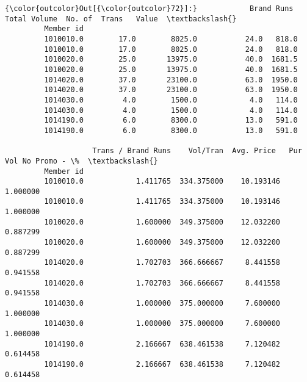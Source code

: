 \documentclass[11pt]{article}
\begin{document}
\begin{Verbatim}[commandchars=\\\{\}]
{\color{outcolor}Out[{\color{outcolor}72}]:}            Brand Runs  Total Volume  No. of  Trans   Value  \textbackslash{}
         Member id                                                    
         1010010.0        17.0        8025.0           24.0   818.0   
         1010010.0        17.0        8025.0           24.0   818.0   
         1010020.0        25.0       13975.0           40.0  1681.5   
         1010020.0        25.0       13975.0           40.0  1681.5   
         1014020.0        37.0       23100.0           63.0  1950.0   
         1014020.0        37.0       23100.0           63.0  1950.0   
         1014030.0         4.0        1500.0            4.0   114.0   
         1014030.0         4.0        1500.0            4.0   114.0   
         1014190.0         6.0        8300.0           13.0   591.0   
         1014190.0         6.0        8300.0           13.0   591.0   
         
                    Trans / Brand Runs    Vol/Tran  Avg. Price   Pur Vol No Promo - \%  \textbackslash{}
         Member id                                                                      
         1010010.0            1.411765  334.375000    10.193146              1.000000   
         1010010.0            1.411765  334.375000    10.193146              1.000000   
         1010020.0            1.600000  349.375000    12.032200              0.887299   
         1010020.0            1.600000  349.375000    12.032200              0.887299   
         1014020.0            1.702703  366.666667     8.441558              0.941558   
         1014020.0            1.702703  366.666667     8.441558              0.941558   
         1014030.0            1.000000  375.000000     7.600000              1.000000   
         1014030.0            1.000000  375.000000     7.600000              1.000000   
         1014190.0            2.166667  638.461538     7.120482              0.614458   
         1014190.0            2.166667  638.461538     7.120482              0.614458   
         

\end{Verbatim}
\end{document}
